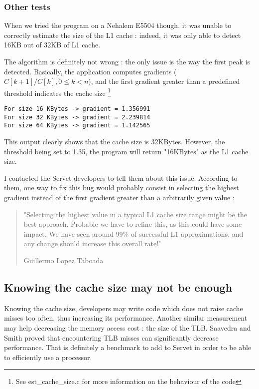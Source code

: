 \subsubsection{Other tests}
When we tried the program on a Nehalem E5504 though, it was unable to correctly
estimate the size of the L1 cache : indeed, it was only able to detect 16KB out
of 32KB of L1 cache.

The algorithm is definitely not wrong : the only issue is the way the first
peak is detected. Basically, the application computes gradients ($ C[k+1]/C[k],
0 \le k < n $), and the first gradient greater than a predefined threshold
indicates the cache size \footnote{See est\_cache\_size.c for more
information on the behaviour of the code}

\lstset{caption=A part of the output of $./job.sh\ est\_cache$ on a Nehalem E5504}
\begin{lstlisting}
For size 16 KBytes -> gradient = 1.356991 
For size 32 KBytes -> gradient = 2.239814 
For size 64 KBytes -> gradient = 1.142565 
\end{lstlisting}

This output clearly shows that the cache size is 32KBytes. However, the
threshold being set to 1.35, the program will return "16KBytes" as the L1 cache
size.

I contacted the Servet developers to tell them about this issue. According to
them, one way to fix this bug would probably consist in selecting the highest
gradient instead of the first gradient greater than a arbitrarily given value :

\begin{quotation}
"Selecting the highest value in a typical L1 cache size range might be the best
approach. Probable we have to refine this, as this could have some impact. We
have seen around 99\% of successful L1 approximations, and any change should
increase this overall rate!"
\begin{flushright}Guillermo Lopez Taboada\end{flushright}
\end{quotation}

\subsection{Knowing the cache size may not be enough}
Knowing the cache size, developers may write code which does not raise cache
misses too often, thus increasing its performance. Another similar measurement
may help decreasing the memory access cost : the size of the TLB. Saavedra and
Smith\cite{Cache_TLB} proved that encountering TLB misses can significantly
decrease performance. That is definitely a benchmark to add to Servet in order
to be able to efficiently use a processor.

